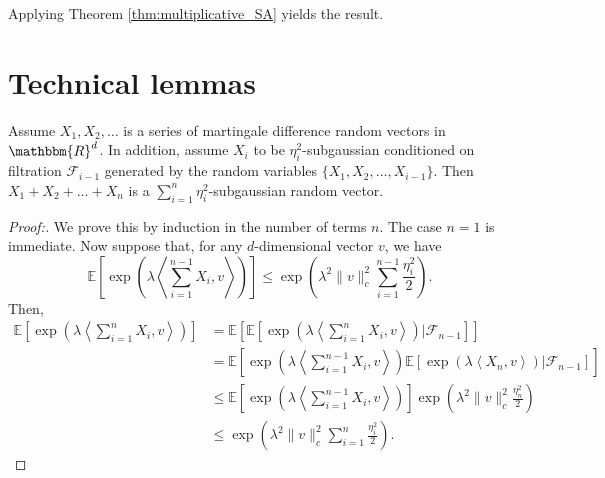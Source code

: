 \documentclass[letterpaper, 10 pt]{article}
\newcommand{\E}{\mathbb{E}}
\begin{document}
Applying Theorem \ref{thm:multiplicative_SA} yields the result.









\section{Technical lemmas}



\begin{lemma}\label{lem:martingale_sub}
    Assume $X_1,X_2,\dots$ is a series of martingale difference random vectors in $\mathbbm{R}^d$. In addition, assume $X_i$ to be $\eta_i^2$-subgaussian conditioned on filtration $\mathcal{F}_{i-1}$ generated by the random variables $\{X_1,X_2,\dots,X_{i-1}\}$. Then $X_1+X_2+\dots+X_n$ is a $\sum_{i=1}^n\eta_i^2$-subgaussian random vector.
\end{lemma}
\begin{proof}[Proof:]
We prove this by induction in the number of terms $n$. The case $n=1$ is immediate. Now suppose that, for any $d$-dimensional vector $v$, we have
\begin{equation}
    \E\left[ \exp\left(\lambda\left\langle \sum_{i=1}^{n-1} X_i, v\right\rangle\right)\right] \leq \exp\left(\lambda^2\|v\|^2_c\sum_{i=1}^{n-1} \frac{\eta_i^2}{2} \right). \label{eq:induction_hyp}
\end{equation}
Then,
    \begin{align*}
        \E\left[ \exp\left(\lambda\left\langle \sum_{i=1}^n X_i, v\right\rangle\right)\right] &=\E\left[\E\left[\exp\left(\lambda\left\langle \sum_{i=1}^n X_i,v\right\rangle\right)\Bigg| \mathcal{F}_{n-1}\right]  \right]\\
        &=\E \left[\exp\left(\lambda\left\langle \sum_{i=1}^{n-1} X_i,v\right\rangle\right)\E\left[\exp\left(\lambda\left\langle  X_n,v\right\rangle\right)\Bigg| \mathcal{F}_{n-1}\right]  \right]\\
        &\leq\E \left[\exp\left(\lambda\left\langle \sum_{i=1}^{n-1} X_i, v\right\rangle\right) \right] \exp\left(\lambda^2 \|v\|^2_c \frac{\eta_n^2}{2} \right) \tag{$X_n$ is subgaussian}\\
        &\leq\exp\left(\lambda^2\|v\|^2_c\sum_{i=1}^n \frac{\eta_i^2}{2} \right). \tag{Inductive hypothesis}
    \end{align*}
\end{proof}
\end{document}

